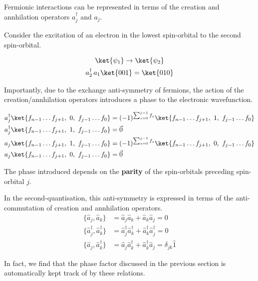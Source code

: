 Fermionic interactions can be represented in terms of the creation and annhilation operators $a_j^\dagger$ and $a_j$. \bigskip

Consider the excitation of an electron in the lowest spin-orbital to the second spin-orbital.

\begin{equation*}
\begin{gathered}
    \ket{\psi_1} \rightarrow \ket{\psi_2} \\
    a_2^\dagger \, a_1 \ket{001} = \ket{010}
\end{gathered}
\end{equation*}

Importantly, due to the exchange anti-symmetry of fermions, the action of the creation/annhilation operators introduces a phase to the electronic wavefunction.

\begin{align*}
    a_j^\dagger \ket{f_{n-1} \dots
    f_{j+1},\,\, 0,\,\, f_{j-1} \dots f_0} &=
    (-1)^{\sum_{s=0}^{j-1} f_s}
    \ket{f_{n-1} \dots f_{j+1},\,\, 1,\,\, f_{j-1} \dots f_0} \\
    a_j^\dagger \ket{f_{n-1} \dots f_{j+1},\,\, 1,\,\, f_{j-1}
    \dots f_0} &= \vec 0 \\
    a_j \ket{f_{n-1} \dots f_{j+1},\,\, 1,\,\, f_{j-1} \dots f_0} &=
    (-1)^{\sum_{s=0}^{j-1} f_s}
    \ket{f_{n-1} \dots f_{j+1},\,\, 0,\,\, f_{j-1} \dots f_0} \\
    a_j \ket{f_{n-1} \dots f_{j+1},\,\, 0,\,\, f_{j-1} \dots f_0} &= \vec 0
\end{align*}

The phase introduced depends on the \textbf{parity} of the spin-orbitals preceding spin-orbital $j$.

In the second-quantisation, this anti-symmetry is expressed in terms of the anti-commutation of creation and annhilation operators.
\begin{align*}
    \{ \hat a_{j}, \hat a_{k} \} &=
    \hat a_{j} \hat a_{k} + \hat a_{k} \hat a_{j} = 0 \\
    \{ \hat a_{j}^{\dagger}, \hat a_{k}^{\dagger} \} &=
    \hat a_{j}^\dagger \hat a_{k}^\dagger + \hat a_{k}^\dagger \hat a_{j}^\dagger = 0 \\
    \{ \hat a_{j}, \hat a_{k}^{\dagger} \} &= \hat a_{j} \hat a_{k}^\dagger + \hat a_{k}^\dagger \hat a_{j} = \delta_{jk} \hat{1}
\end{align*}

In fact, we find that the phase factor discussed in the previous section is automatically kept track of by these relations.

